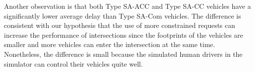 Another observation is that both Type SA-ACC and Type SA-CC vehicles
have a significantly lower average delay than Type SA-Com vehicles.
The difference is consistent with our hypothesis that the use of more
constrained requests can increase the performance of intersections
since the footprints of the vehicles are smaller and more vehicles can
enter the intersection at the same time.  Nonetheless, the difference
is small because the simulated human drivers in the simulator can
control their vehicles quite well.












